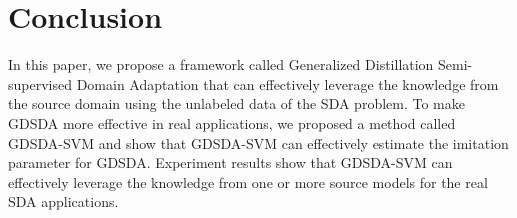 \documentclass{llncs}
\begin{document}
\section{Conclusion}\label{sec:con}
In this paper, we propose a framework called {Generalized Distillation Semi-supervised Domain Adaptation} that can effectively leverage the knowledge from the source domain using the unlabeled data of the SDA problem. To make GDSDA more effective in real applications, we proposed a method called GDSDA-SVM and show that GDSDA-SVM can effectively estimate the imitation parameter for GDSDA. Experiment results show that GDSDA-SVM can effectively leverage the knowledge from one or more source models for the real SDA applications.







\end{document}
